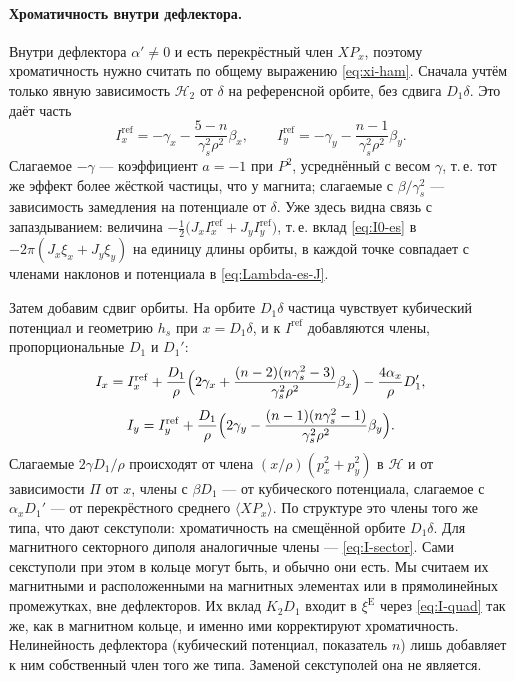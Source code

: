 \paragraph{Хроматичность внутри дефлектора.}
Внутри дефлектора $\alpha'\neq0$ и есть перекрёстный член $XP_x$, поэтому хроматичность нужно считать по общему выражению \eqref{eq:xi-ham}. Сначала учтём только явную зависимость $\mathcal{H}_2$ от $\delta$ на референсной орбите, без сдвига $D_1\delta$. Это даёт часть
\begin{equation}
\label{eq:I0-es}
I_x^{\mathrm{ref}}=-\gamma_x-\frac{5-n}{\gamma_s^2\rho^2}\beta_x,
\qquad
I_y^{\mathrm{ref}}=-\gamma_y-\frac{n-1}{\gamma_s^2\rho^2}\beta_y.
\end{equation}
Слагаемое $-\gamma$ --- коэффициент $a=-1$ при $P^2$, усреднённый с весом $\gamma$, т.\,е. тот же эффект более жёсткой частицы, что у магнита; слагаемые с $\beta/\gamma_s^2$ --- зависимость замедления на потенциале от $\delta$. Уже здесь видна связь с запаздыванием: величина $-\tfrac12\bigl(J_xI_x^{\mathrm{ref}}+J_yI_y^{\mathrm{ref}}\bigr)$, т.\,е. вклад \eqref{eq:I0-es} в $-2\pi(J_x\xi_x+J_y\xi_y)$ на единицу длины орбиты, в каждой точке совпадает с членами наклонов и потенциала в \eqref{eq:Lambda-es-J}.

Затем добавим сдвиг орбиты. На орбите $D_1\delta$ частица чувствует кубический потенциал и геометрию $h_s$ при $x=D_1\delta$, и к $I^{\mathrm{ref}}$ добавляются члены, пропорциональные $D_1$ и $D_1'$:
\begin{equation}
\label{eq:Ix-es}
I_x=I_x^{\mathrm{ref}}
+\frac{D_1}{\rho}\Bigl(
2\gamma_x+\frac{(n-2)(n\gamma_s^2-3)}{\gamma_s^2\rho^2}\beta_x
\Bigr)
-\frac{4\alpha_x}{\rho}D_1',
\end{equation}
\begin{equation}
\label{eq:Iy-es}
I_y=I_y^{\mathrm{ref}}
+\frac{D_1}{\rho}\Bigl(
2\gamma_y-\frac{(n-1)(n\gamma_s^2-1)}{\gamma_s^2\rho^2}\beta_y
\Bigr).
\end{equation}
Слагаемые $2\gamma D_1/\rho$ происходят от члена $(x/\rho)(p_x^2+p_y^2)$ в $\mathcal{H}$ и от зависимости $\Pi$ от $x$, члены с $\beta D_1$ --- от кубического потенциала, слагаемое с $\alpha_xD_1'$ --- от перекрёстного среднего $\langle XP_x\rangle$. По структуре это члены того же типа, что дают секступоли: хроматичность на смещённой орбите $D_1\delta$. Для магнитного секторного диполя аналогичные члены --- \eqref{eq:I-sector}. Сами секступоли при этом в кольце могут быть, и обычно они есть. Мы считаем их магнитными и расположенными на магнитных элементах или в прямолинейных промежутках, вне дефлекторов. Их вклад $K_2D_1$ входит в $\xi^{\mathrm{E}}$ через \eqref{eq:I-quad} так же, как в магнитном кольце, и именно ими корректируют хроматичность. Нелинейность дефлектора (кубический потенциал, показатель $n$) лишь добавляет к ним собственный член того же типа. Заменой секступолей она не является.

